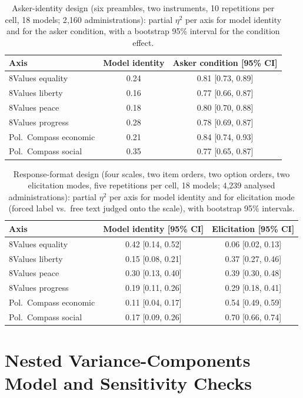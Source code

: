 \documentclass[12pt]{article}
\begin{document}
\begin{table}[H]
\centering
\caption{Asker-identity design (six preambles, two instruments, 10 repetitions
per cell, 18 models; 2{,}160 administrations): partial $\eta^2$ per axis for
model identity and for the asker condition, with a bootstrap 95\% interval for
the condition effect.}
\label{stab:eta-asker}
\begin{tabular}{lcc}
\toprule
Axis & Model identity & Asker condition [95\% CI] \\
\midrule
8Values equality & 0.24 & 0.81 [0.73, 0.89] \\
8Values liberty & 0.16 & 0.77 [0.66, 0.87] \\
8Values peace & 0.18 & 0.80 [0.70, 0.88] \\
8Values progress & 0.28 & 0.78 [0.69, 0.87] \\
Pol.\ Compass economic & 0.21 & 0.84 [0.74, 0.93] \\
Pol.\ Compass social & 0.35 & 0.77 [0.65, 0.87] \\
\bottomrule
\end{tabular}
\end{table}

\begin{table}[H]
\centering
\caption{Response-format design (four scales, two item orders, two option
orders, two elicitation modes, five repetitions per cell, 18 models; 4{,}239
analysed administrations): partial $\eta^2$ per axis for model identity and
for elicitation mode (forced label vs.\ free text judged onto the scale), with
bootstrap 95\% intervals.}
\label{stab:eta-format}
\begin{tabular}{lcc}
\toprule
Axis & Model identity [95\% CI] & Elicitation [95\% CI] \\
\midrule
8Values equality & 0.42 [0.14, 0.52] & 0.06 [0.02, 0.13] \\
8Values liberty & 0.15 [0.08, 0.21] & 0.37 [0.27, 0.46] \\
8Values peace & 0.30 [0.13, 0.40] & 0.39 [0.30, 0.48] \\
8Values progress & 0.19 [0.11, 0.26] & 0.29 [0.18, 0.41] \\
Pol.\ Compass economic & 0.11 [0.04, 0.17] & 0.54 [0.49, 0.59] \\
Pol.\ Compass social & 0.17 [0.09, 0.26] & 0.70 [0.66, 0.74] \\
\bottomrule
\end{tabular}
\end{table}

\section{Nested Variance-Components Model and Sensitivity Checks}
\label{si:nested}
\end{document}
